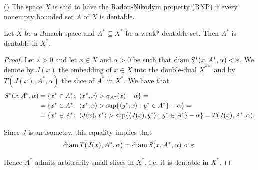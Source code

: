 \begin{definition}(\cite[definition 5.2]{Phelps1993})
  \label{def:radon-nikodym-property}
  The space $X$ is said to have the \uline{Radon-Nikodym property (RNP)} if every nonempty bounded set $A$ of $X$ is dentable.
\end{definition}

\begin{proposition}
  \label{thm:weak_dentable_sets_are_dentable}
  Let $X$ be a Banach space and $A^* \subseteq X^*$ be a weak*-dentable set. Then $A^*$ is dentable in $X^*$.
\end{proposition}
\begin{proof}
  Let $\varepsilon > 0$ and let $x \in X$ and $\alpha > 0$ be such that $\operatorname{diam} S^*(x, A^*, \alpha) < \varepsilon$.
  We denote by $J(x)$ the embedding of $x \in X$ into the double-dual $X^{**}$ and by $T(J(x), A^*, \alpha)$ the slice of $A^*$ in $X^*$. We have that
  \begin{align*}
    S^*(x, A^*, \alpha)
    &=
    \{ x^* \in A^* \colon \left\langle x^*, x \right\rangle > \sigma_{A^*}(x) - \alpha \}
    = \\ &=
    \{ x^* \in A^* \colon \left\langle x^*, x \right\rangle > \sup \{ \left\langle y^*, x \right\rangle \colon y^* \in A^* \} - \alpha \}
    = \\ &=
    \{ x^* \in A^* \colon \left\langle J(x), x^* \right\rangle > \sup \{ \left\langle J(x), y^* \right\rangle \colon y^* \in A^* \} - \alpha \}
    =
    T(J(x), A^*, \alpha),
  \end{align*}

  Since $J$ is an isometry, this equality implies that
  \begin{align*}
    \operatorname{diam} T(J(x), A^*, \alpha) = \operatorname{diam} S(x, A^*, \alpha) < \varepsilon.
  \end{align*}

  Hence $A^*$ admits arbitrarily small slices in $X^*$, i.e. it is dentable in $X^*$.
\end{proof}
